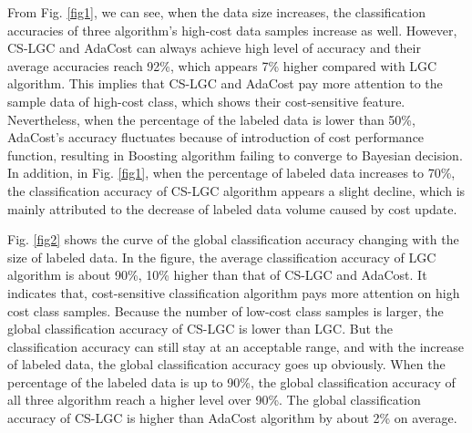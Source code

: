 \documentclass{svjour3}                     %
\begin{document}
From Fig. \ref{fig1}, we can see, when the data size increases, the classification accuracies of three algorithm's high-cost data samples increase as well. However, CS-LGC and AdaCost can always achieve high level of accuracy and their average accuracies reach 92\%, which appears 7\% higher compared with LGC algorithm. This implies that CS-LGC and AdaCost pay more attention to the sample data of high-cost class, which shows their cost-sensitive feature. Nevertheless, when the percentage of the labeled data is lower than 50\%, AdaCost's accuracy fluctuates because of introduction of cost performance function, resulting in Boosting algorithm failing to converge to Bayesian decision. In addition, in Fig. \ref{fig1}, when the percentage of labeled data increases to 70\%, the classification accuracy of CS-LGC algorithm appears a slight decline, which is mainly attributed to the decrease of labeled data volume caused by cost update.

Fig. \ref{fig2} shows the curve of the global classification accuracy changing with the size of labeled data. In the figure, the average classification accuracy of LGC algorithm is about 90\%, 10\% higher than that of CS-LGC and AdaCost. It indicates that, cost-sensitive classification algorithm pays more attention on high cost class samples. Because the number of low-cost class samples is larger, the global classification accuracy of CS-LGC is lower than LGC. But the classification accuracy can still stay at an acceptable range, and with the increase of labeled data, the global classification accuracy goes up obviously. When the percentage of the labeled data is up to 90\%, the global classification accuracy of all three algorithm reach a higher level over 90\%. The global classification accuracy of CS-LGC is higher than AdaCost algorithm by about 2\% on average.
\end{document}
